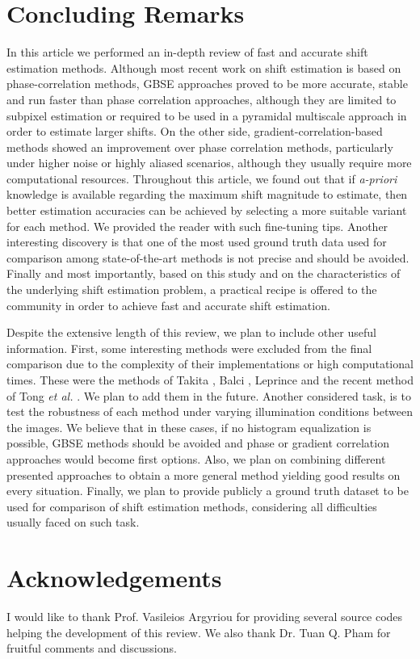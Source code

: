 \section{Concluding Remarks}
\label{sec:conclusionsChapter1}

In this article we performed an in-depth review of fast and accurate shift estimation methods.  Although most recent work on shift estimation is based on phase-correlation methods, GBSE approaches proved to be more accurate, stable and run faster than phase correlation approaches, although they are limited to subpixel estimation or required to be used in a pyramidal multiscale approach in order to estimate larger shifts. On the other side, gradient-correlation-based methods showed an improvement over phase correlation methods, particularly under higher noise or highly aliased scenarios, although they usually require more computational resources. Throughout this article, we found out that if \emph{a-priori} knowledge is available regarding the maximum shift magnitude to estimate, then better estimation accuracies can be achieved by selecting a more suitable variant for each method. We provided the reader with such fine-tuning tips. Another interesting discovery is that one of the most used ground truth data used for comparison among state-of-the-art methods is not precise and should be avoided. Finally and most importantly, based on this study and on the characteristics of the underlying shift estimation problem, a practical recipe is offered to the community in order to achieve fast and accurate shift estimation.


Despite the extensive length of this review, we plan to include other useful information. First, some interesting methods were excluded from the final comparison due to the complexity of their implementations or high computational times. These were the methods of Takita \cite{Takita2003}, Balci \cite{Balci_2005}, Leprince \cite{leprince2007automatic} and the recent method of Tong \emph{et al.} \cite{tong2015novel}. We plan to add them in the future. Another considered task, is to test the robustness of each method under varying illumination conditions between the images. We believe that in these cases, if no histogram equalization is possible, GBSE methods should be avoided and phase or gradient correlation approaches would become first options. Also, we plan on combining different presented approaches to obtain a more general method yielding good results on every situation. Finally, we plan to provide publicly a ground truth dataset to be used for comparison of shift estimation methods, considering all difficulties usually faced on such task.

\section*{Acknowledgements}
	I would like to thank Prof. Vasileios Argyriou for providing several source codes helping the development of this review. We also thank Dr. Tuan Q. Pham for fruitful comments and discussions.

